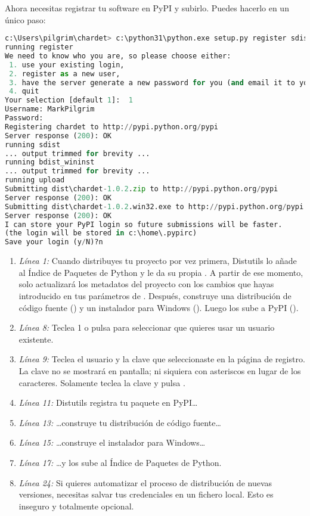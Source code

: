 {Ahora necesitas registrar tu software en PyPI y subirlo. Puedes hacerlo en un único paso:

\begin{lstlisting}[language=Python,breaklines=true]
c:\Users\pilgrim\chardet> c:\python31\python.exe setup.py register sdist bdist_wininst upload
running register
We need to know who you are, so please choose either:
 1. use your existing login,
 2. register as a new user,
 3. have the server generate a new password for you (and email it to you), or
 4. quit
Your selection [default 1]:  1
Username: MarkPilgrim
Password:
Registering chardet to http://pypi.python.org/pypi  
Server response (200): OK
running sdist
... output trimmed for brevity ...
running bdist_wininst
... output trimmed for brevity ...
running upload
Submitting dist\chardet-1.0.2.zip to http://pypi.python.org/pypi
Server response (200): OK
Submitting dist\chardet-1.0.2.win32.exe to http://pypi.python.org/pypi
Server response (200): OK
I can store your PyPI login so future submissions will be faster.
(the login will be stored in c:\home\.pypirc)
Save your login (y/N)?n
\end{lstlisting}

\begin{enumerate}
  \item \emph{Línea 1:} Cuando distribuyes tu proyecto por vez primera, Distutils lo añade al Índice de Paquetes de Python y le da su propia . A partir de ese momento, solo actualizará los metadatos del proyecto con los cambios que hayas introducido en tus parámetros de . Después, construye una distribución de código fuente () y un instalador para Windows (). Luego los sube a PyPI ().
  \item \emph{Línea 8:} Teclea 1 o pulsa  para seleccionar que quieres usar un usuario existente.
  \item \emph{Línea 9:} Teclea el usuario y la clave que seleccionaste en la página de registro. La clave no se mostrará en pantalla; ni siquiera con asteriscos en lugar de los caracteres. Solamente teclea la clave y pulsa .
  \item \emph{Línea 11:} Distutils registra tu paquete en PyPI\ldots
  \item \emph{Línea 13:} \ldots construye tu distribución de código fuente\ldots
  \item \emph{Línea 15:} \ldots construye el instalador para Windows\ldots
  \item \emph{Línea 17:} \ldots y los sube al Índice de Paquetes de Python.
  \item \emph{Línea 24:} Si quieres automatizar el proceso de distribución de nuevas versiones, necesitas salvar tus credenciales en un fichero local. Esto es inseguro y totalmente opcional.
\end{enumerate}

}
